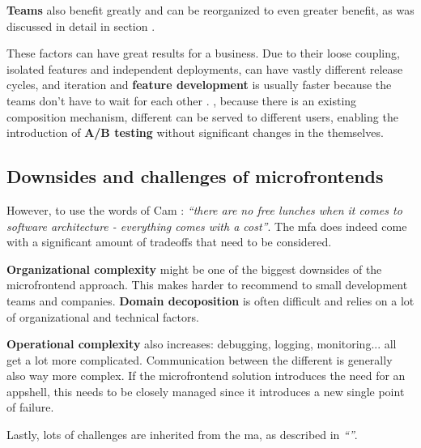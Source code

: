 \textbf{Teams} also benefit greatly and can be reorganized to even greater
benefit, as was discussed in detail in section .

These factors can have great results for a business. Due to their loose
coupling, isolated features and independent deployments,
 can have vastly different release cycles, and
iteration and \textbf{feature development} is usually faster because the teams
don't have to wait for each other \autocite{Geers_2020}. \textcite{Rappl_2021},
because there is an existing composition mechanism, different
 can be served to different users, enabling the
introduction of \textbf{A/B testing} without significant changes in the
 themselves.

\subsection{Downsides and challenges of microfrontends}

However, to use the words of Cam \textcite{Jackson_2019}: \textit{``there are no
free lunches when it comes to software architecture - everything comes with a
cost''}. The \gls{mfa} does indeed come with a significant amount of tradeoffs
that need to be considered. 

\textbf{Organizational complexity} might be one of the biggest downsides of the
\gls{microfrontend} approach. This makes  harder to
recommend to small development teams and companies. \textbf{Domain decoposition}
is often difficult and relies on a lot of organizational and technical factors. 

\textbf{Operational complexity} also increases: debugging, logging,
monitoring... all get a lot more complicated. Communication between the
different  is generally also way more complex. If the
\gls{microfrontend} solution introduces the need for an \gls{appshell}, this
needs to be closely managed since it introduces a new single point of failure.

Lastly, lots of challenges are inherited from the \gls{ma}, as described in
\textit{``''}.

